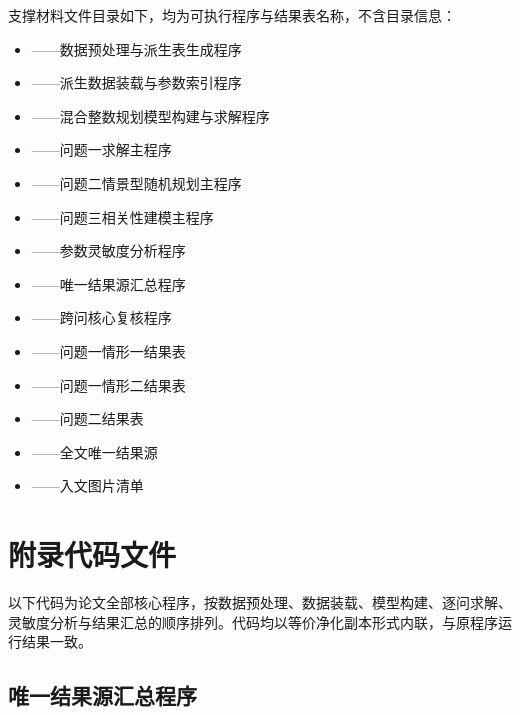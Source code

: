 \documentclass[bwprint]{gmcmthesis}
\begin{document}
\begin{appendices}
\par\noindent\hspace{2em}支撑材料文件目录如下，均为可执行程序与结果表名称，不含目录信息：\par

\newcommand{\AppendixCodeName}[1]{#1}

\begin{itemize}[label={},leftmargin=1.9em,itemsep=0.25em,topsep=0.25em]
    \item \textbf{}——数据预处理与派生表生成程序
    \item \textbf{}——派生数据装载与参数索引程序
    \item \textbf{}——混合整数规划模型构建与求解程序
    \item \textbf{}——问题一求解主程序
    \item \textbf{}——问题二情景型随机规划主程序
    \item \textbf{}——问题三相关性建模主程序
    \item \textbf{}——参数灵敏度分析程序
    \item \textbf{}——唯一结果源汇总程序
    \item \textbf{}——跨问核心复核程序
    \item \textbf{}——问题一情形一结果表
    \item \textbf{}——问题一情形二结果表
    \item \textbf{}——问题二结果表
    \item \textbf{}——全文唯一结果源
    \item \textbf{}——入文图片清单
\end{itemize}

\section{附录代码文件}

以下代码为论文全部核心程序，按数据预处理、数据装载、模型构建、逐问求解、灵敏度分析与结果汇总的顺序排列。代码均以等价净化副本形式内联，与原程序运行结果一致。

\subsection{唯一结果源汇总程序}


\end{appendices}
\end{document}
